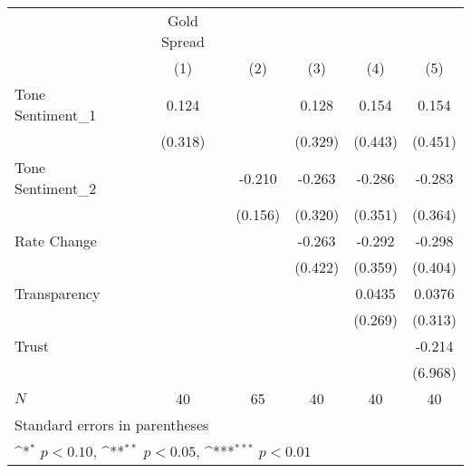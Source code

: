 {
\def\sym#1{\ifmmode^{#1}\else\(^{#1}\)\fi}
\begin{tabular}{l*{5}{c}}
\hline\hline
            & Gold Spread         &                     &                     &                     &                     \\
            &\multicolumn{1}{c}{(1)}         &\multicolumn{1}{c}{(2)}         &\multicolumn{1}{c}{(3)}         &\multicolumn{1}{c}{(4)}         &\multicolumn{1}{c}{(5)}         \\
\hline
Tone Sentiment\_{1}&       0.124         &                     &       0.128         &       0.154         &       0.154         \\
            &     (0.318)         &                     &     (0.329)         &     (0.443)         &     (0.451)         \\
[1em]
Tone Sentiment\_{2}&                     &      -0.210         &      -0.263         &      -0.286         &      -0.283         \\
            &                     &     (0.156)         &     (0.320)         &     (0.351)         &     (0.364)         \\
[1em]
Rate Change &                     &                     &      -0.263         &      -0.292         &      -0.298         \\
            &                     &                     &     (0.422)         &     (0.359)         &     (0.404)         \\
[1em]
Transparency&                     &                     &                     &      0.0435         &      0.0376         \\
            &                     &                     &                     &     (0.269)         &     (0.313)         \\
[1em]
Trust       &                     &                     &                     &                     &      -0.214         \\
            &                     &                     &                     &                     &     (6.968)         \\
\hline
\(N\)       &          40         &          65         &          40         &          40         &          40         \\
\hline\hline
\multicolumn{6}{l}{\footnotesize Standard errors in parentheses}\\
\multicolumn{6}{l}{\footnotesize \sym{*} \(p<0.10\), \sym{**} \(p<0.05\), \sym{***} \(p<0.01\)}\\
\end{tabular}
}
